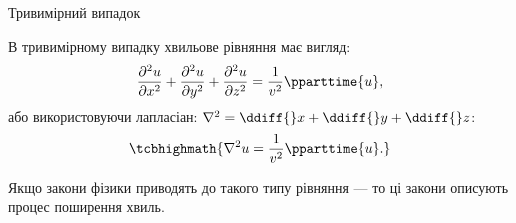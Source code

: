 \documentclass[onlytextwidth]{beamer}
\begin{document}





\begin{frame}{Тривимірний випадок}{}

	\begin{block}{}\justifying
		В тривимірному випадку \alert{хвильове рівняння} має вигляд:
		\begin{equation*}
			\frac{\partial^2 u}{\partial x^2} + \frac{\partial^2 u}{\partial y^2} + \frac{\partial^2 u}{\partial z^2} = \frac1{v^2}\pparttime{u},
		\end{equation*}
		або використовуючи лапласіан: $\nabla^2 = \ddiff{}x + \ddiff{}y +\ddiff{}z$:
		\begin{equation*}
			\tcbhighmath{\nabla^2 u = \frac1{v^2}\pparttime{u}.}
		\end{equation*}
	\end{block}
	\begin{alertblock}{}\centering
		Якщо закони фізики приводять до такого типу рівняння --- то ці закони описують процес поширення хвиль.
	\end{alertblock}
\end{frame}
\end{document}
